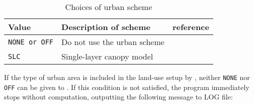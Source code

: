 \begin{table}[hbt]
\begin{center}
  \caption{Choices of urban scheme}
  \label{tab:nml_urban}
  \begin{tabularx}{150mm}{llX} \hline
    \rowcolor[gray]{0.9}  Value  & Description of scheme & reference \\ \hline
      \verb|NONE or OFF|  & Do not use the urban scheme            \\
      \verb|SLC|          & Single-layer canopy model  & \citet{kusaka_2001} \\
    \hline
  \end{tabularx}
\end{center}
\end{table}

If the type of urban area is included in the land-use setup by , neither \verb|NONE| nor \verb|OFF| can be given to . If this condition is not satisfied, the program immediately stops without computation, outputting the following message to LOG file:

